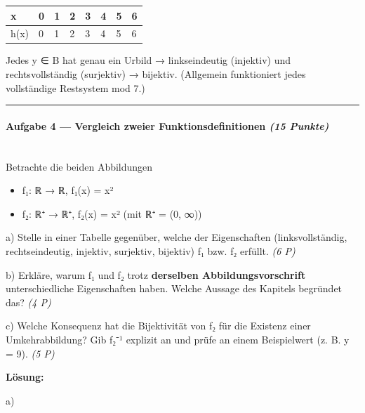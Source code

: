 \documentclass[11pt, a4paper]{article}
\begin{document}
\begin{landscape}

{\footnotesize
\begin{tabularx}{\linewidth}{XXXXXXXX}
\hline
\rowcolor{tableheadbg}
{\color{white}\textbf{x}} & {\color{white}\textbf{0}} & {\color{white}\textbf{1}} & {\color{white}\textbf{2}} & {\color{white}\textbf{3}} & {\color{white}\textbf{4}} & {\color{white}\textbf{5}} & {\color{white}\textbf{6}} \\[2pt]
\hline
\endhead
\hline
\endfoot
h(x) & 0 & 1 & 2 & 3 & 4 & 5 & 6 \\
\end{tabularx}
}
\end{landscape}


Jedes y ∈ B hat genau ein Urbild → linkseindeutig (injektiv) und rechtsvollständig (surjektiv) → bijektiv. (Allgemein funktioniert jedes vollständige Restsystem mod 7.)



\noindent\textcolor{rulegray}{\rule{\linewidth}{0.4pt}}


\paragraph{Aufgabe 4 — Vergleich zweier Funktionsdefinitionen \textit{(15 Punkte)}}\mbox{}\\[2pt]

Betrachte die beiden Abbildungen


\begin{itemize}
  \item f₁: ℝ → ℝ, f₁(x) = x²
  \item f₂: ℝ⁺ → ℝ⁺, f₂(x) = x²  (mit ℝ⁺ = (0, ∞))
\end{itemize}

a) Stelle in einer Tabelle gegenüber, welche der Eigenschaften (linksvollständig, rechtseindeutig, injektiv, surjektiv, bijektiv) f₁ bzw. f₂ erfüllt. \textit{(6 P)}


b) Erkläre, warum f₁ und f₂ trotz \textbf{derselben Abbildungsvorschrift} unterschiedliche Eigenschaften haben. Welche Aussage des Kapitels begründet das? \textit{(4 P)}


c) Welche Konsequenz hat die Bijektivität von f₂ für die Existenz einer Umkehrabbildung? Gib f₂⁻¹ explizit an und prüfe an einem Beispielwert (z. B. y = 9). \textit{(5 P)}


\textbf{Lösung:}


a)
\end{document}
